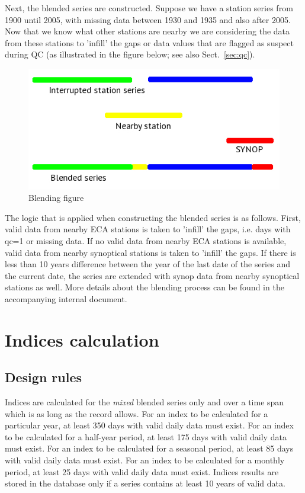 \documentclass[a4paper,11pt]{article}
\begin{document}
Next, the blended series are constructed. Suppose we have a station
series from 1900 until 2005, with missing data between 1930 and 1935
and also after 2005. Now that we know what other stations are nearby
we are considering the data from these stations to 'infill' the gaps
or data values that are flagged as suspect during QC (as illustrated
in the figure below; see also Sect.~\ref{sec:qc}).

\begin{figure}[!ht]
\includegraphics[width=\textwidth]{blended_fig_new1.jpg}
\caption{Blending figure}
\label{fig:blend}
\end{figure}

The logic that is applied when constructing the blended series is as
follows. First, valid data from nearby ECA stations is taken to
'infill' the gaps, i.e. days with qc=1 or missing data. If no valid
data from nearby ECA stations is available, valid data from nearby
synoptical stations is taken to 'infill' the gaps. If there is less
than 10 years difference between the year of the last date of the
series and the current date, the series are extended with synop data
from nearby synoptical stations as well. More details about the
blending process can be found in the accompanying internal document.

\section{Indices calculation}
\label{sec:indices}

\subsection{Design rules}
\label{sec:indicesrules}

Indices are calculated for the \emph{mixed} blended series only and
over a time span which is as long as the record allows.
For an index to be calculated for a
particular year, at least 350 days with valid daily data must
exist. For an index to be calculated for a half-year period, at least
175 days with valid daily data must exist. For an index to be
calculated for a seasonal period, at least 85 days with valid daily
data must exist. For an index to be
calculated for a monthly period, at least 25 days with valid daily
data must exist. Indices results are stored in the database only if a
series contains at least 10 years of valid data. 
\end{document}
